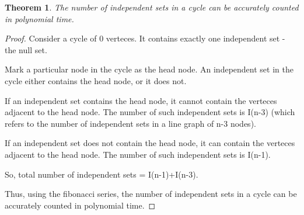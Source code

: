 \documentclass[10pt]{amsart}
\newtheorem{thm}{Theorem}[subsection]
\theoremstyle{remark}
\begin{document}
\begin{thm}
The number of independent sets in a cycle can be accurately counted in polynomial time.
\end{thm}
\begin{proof}
Consider a cycle of 0 verteces. It contains exactly one independent set - the null set.

Mark a particular node in the cycle as the head node. An independent set in the cycle either contains the head node, or it does not.

If an independent set contains the head node, it cannot contain the verteces adjacent to the head node. The number of such independent sets is I(n-3) (which refers to the number of independent sets in a line graph of n-3 nodes).

If an independent set does not contain the head node, it can contain the verteces adjacent to the head node. The number of such independent sets is I(n-1).

So, total number of independent sets = I(n-1)+I(n-3).

Thus, using the fibonacci series, the number of independent sets in a cycle can be accurately counted in polynomial time.

\end{proof}




\end{document}
